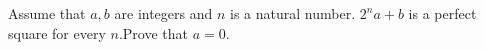 Assume that $a,b$ are integers and $n$ is a natural number. $2^na+b$ is a perfect square for every $n$.Prove that $a=0$.